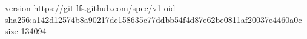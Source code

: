 version https://git-lfs.github.com/spec/v1
oid sha256:a142d12574b8a90217de158635c77ddbb54f4d87e62be0811af20037e4460a0c
size 134094

